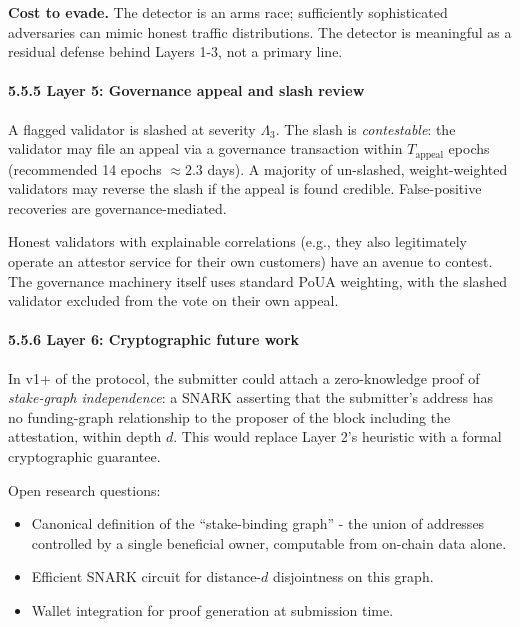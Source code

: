 \documentclass[
  11pt,
]{article}
\providecommand{\tightlist}{%
  \setlength{\itemsep}{0pt}\setlength{\parskip}{0pt}}
\begin{document}
\textbf{Cost to evade.} The detector is an arms race; sufficiently
sophisticated adversaries can mimic honest traffic distributions. The
detector is meaningful as a residual defense behind Layers 1-3, not a
primary line.

\paragraph{5.5.5 Layer 5: Governance appeal and slash
review}\label{layer-5-governance-appeal-and-slash-review}

A flagged validator is slashed at severity \(\Lambda_3\). The slash is
\emph{contestable}: the validator may file an appeal via a governance
transaction within \(T_{\text{appeal}}\) epochs (recommended 14 epochs
\(\approx 2.3\) days). A majority of un-slashed, weight-weighted
validators may reverse the slash if the appeal is found credible.
False-positive recoveries are governance-mediated.

Honest validators with explainable correlations (e.g., they also
legitimately operate an attestor service for their own customers) have
an avenue to contest. The governance machinery itself uses standard PoUA
weighting, with the slashed validator excluded from the vote on their
own appeal.

\paragraph{5.5.6 Layer 6: Cryptographic future
work}\label{layer-6-cryptographic-future-work}

In v1+ of the protocol, the submitter could attach a zero-knowledge
proof of \emph{stake-graph independence}: a SNARK asserting that the
submitter's address has no funding-graph relationship to the proposer of
the block including the attestation, within depth \(d\). This would
replace Layer 2's heuristic with a formal cryptographic guarantee.

Open research questions:

\begin{itemize}
\tightlist
\item
  Canonical definition of the ``stake-binding graph'' - the union of
  addresses controlled by a single beneficial owner, computable from
  on-chain data alone.
\item
  Efficient SNARK circuit for distance-\(d\) disjointness on this graph.
\item
  Wallet integration for proof generation at submission time.
\end{itemize}
\end{document}
